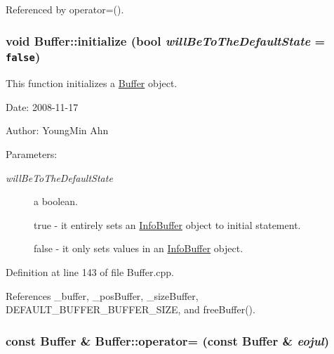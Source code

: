 Referenced by operator=().\hypertarget{classkmaOrange_1_1Buffer_dd289fa535ca2c9576e0226dbaa93a48}{
\subsubsection[{initialize}]{\setlength{\rightskip}{0pt plus 5cm}void Buffer::initialize (bool {\em willBeToTheDefaultState} = {\tt false})}}
\label{classkmaOrange_1_1Buffer_dd289fa535ca2c9576e0226dbaa93a48}


This function initializes a \hyperlink{classkmaOrange_1_1Buffer}{Buffer} object. 

\begin{Desc}
\item[Date:]2008-11-17 \end{Desc}
\begin{Desc}
\item[Author:]YoungMin Ahn \end{Desc}
\begin{Desc}
\item[Parameters:]
\begin{description}
\item[{\em willBeToTheDefaultState}]a boolean.\par
 true - it entirely sets an \hyperlink{classkmaOrange_1_1InfoBuffer}{InfoBuffer} object to initial statement. \par
 false - it only sets values in an \hyperlink{classkmaOrange_1_1InfoBuffer}{InfoBuffer} object. \end{description}
\end{Desc}


Definition at line 143 of file Buffer.cpp.

References \_\-buffer, \_\-posBuffer, \_\-sizeBuffer, DEFAULT\_\-BUFFER\_\-BUFFER\_\-SIZE, and freeBuffer().\hypertarget{classkmaOrange_1_1Buffer_c68390a0989f7433f7727ae4be023c11}{
\subsubsection[{operator=}]{\setlength{\rightskip}{0pt plus 5cm}const {\bf Buffer} \& Buffer::operator= (const {\bf Buffer} \& {\em eojul})}}
\label{classkmaOrange_1_1Buffer_c68390a0989f7433f7727ae4be023c11}


